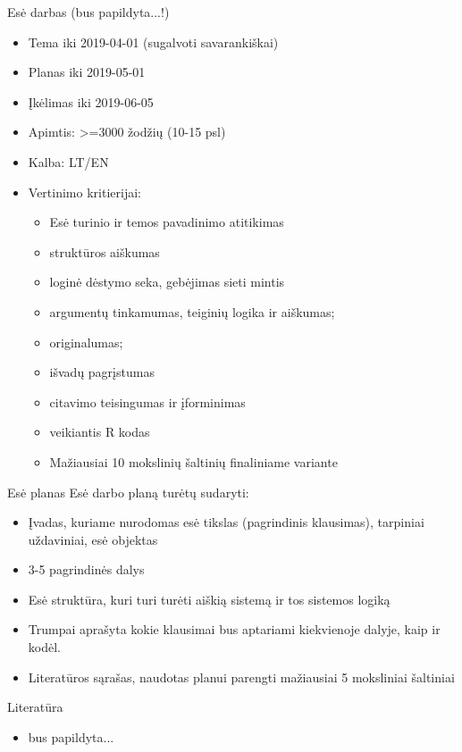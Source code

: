 \documentclass[11pt,xcolor=table]{beamer}
\begin{document}
\begin{frame}{Esė darbas (bus papildyta...!) }
\begin{itemize}
\item Tema iki 2019-04-01 (sugalvoti savarankiškai)
\item Planas iki 2019-05-01
\item Įkėlimas iki 2019-06-05
\item Apimtis: >=3000 žodžių (10-15 psl)
\item Kalba: LT/EN
\item Vertinimo kritierijai:
\begin{itemize}
\item Esė turinio ir temos pavadinimo atitikimas
\item struktūros aiškumas
\item loginė dėstymo seka, gebėjimas sieti mintis
\item argumentų tinkamumas, teiginių logika ir aiškumas;
\item originalumas;
\item išvadų pagrįstumas
\item citavimo teisingumas ir įforminimas
\item veikiantis R kodas
\item Mažiausiai 10 mokslinių šaltinių finaliniame variante
\end{itemize}
\end{itemize}
\end{frame}

\begin{frame}{Esė planas}
Esė darbo planą turėtų sudaryti:
\begin{itemize}
\item Įvadas, kuriame nurodomas esė tikslas (pagrindinis klausimas), tarpiniai uždaviniai, esė objektas
\item 3-5 pagrindinės dalys
\item Esė struktūra, kuri turi turėti aiškią sistemą ir tos sistemos logiką
\item Trumpai aprašyta kokie klausimai bus aptariami kiekvienoje dalyje, kaip ir kodėl.
\item Literatūros sąrašas, naudotas planui parengti mažiausiai 5 moksliniai šaltiniai
\end{itemize}
\end{frame}


\begin{frame}{Literatūra}
\begin{itemize}
\item bus papildyta...
\end{itemize}
\end{frame}
\end{document}
